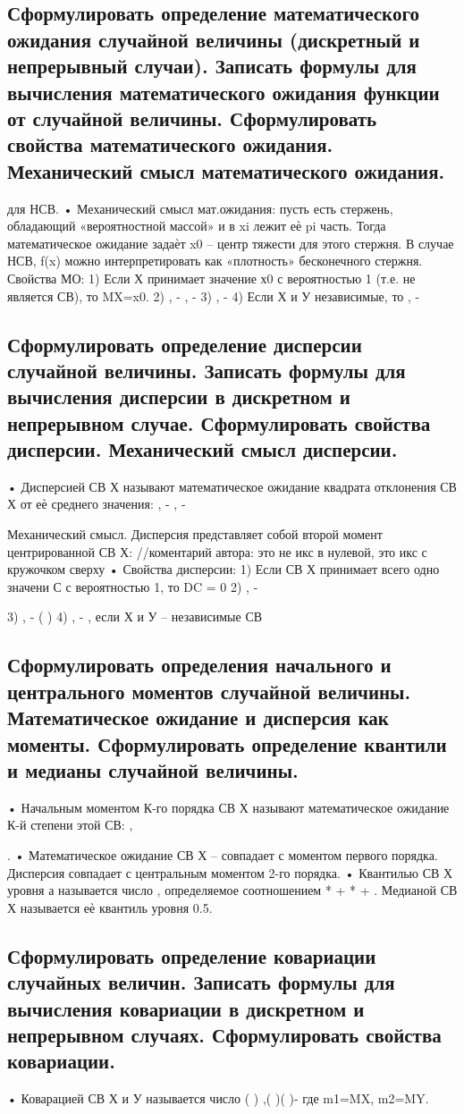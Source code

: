 \subsection{Сформулировать определение математического ожидания случайной величины (дискретный и непрерывный случаи). Записать формулы для вычисления математического ожидания функции от случайной величины. Сформулировать свойства математического ожидания. Механический смысл математического ожидания.}



для НСВ.
• Механический смысл мат.ожидания: пусть есть стержень, обладающий «вероятностной массой» и в xi лежит еѐ pi часть. Тогда
математическое ожидание задаѐт x0 – центр тяжести для этого стержня. В случае НСВ, f(x) можно интерпретировать как «плотность»
бесконечного стержня.
Свойства МО:
1) Если Х принимает значение х0 с вероятностью 1 (т.е. не является СВ), то MX=x0.
2) , - , -
3) , -
4) Если Х и У независимые, то , - 

\subsection{Сформулировать определение дисперсии случайной величины. Записать формулы для вычисления дисперсии в дискретном и непрерывном случае. Сформулировать свойства дисперсии. Механический смысл дисперсии.}

• Дисперсией СВ Х называют математическое ожидание квадрата отклонения СВ Х от еѐ среднего значения: , - , -



Механический смысл. Дисперсия представляет собой второй момент центрированной СВ Х:
//коментарий автора: это не икс в
нулевой, это икс с кружочком сверху
• Свойства дисперсии:
1) Если СВ Х принимает всего одно значени С с вероятностью 1, то DC = 0
2) , -

3) ,
- (
)
4) , - , если Х и У – независимые СВ

\subsection{Сформулировать определения начального и центрального моментов случайной величины. Математическое ожидание и дисперсия как моменты. Сформулировать определение квантили и медианы случайной величины.}

• Начальным моментом К-го порядка СВ Х называют математическое ожидание К-й степени этой СВ: ,



.
• Математическое ожидание СВ Х – совпадает с моментом первого порядка. Дисперсия совпадает с центральным моментом 2-го порядка.
• Квантилью СВ Х уровня а называется число , определяемое соотношением *
+ *
+ . Медианой СВ Х
называется еѐ квантиль уровня 0.5.

\subsection{Сформулировать определение ковариации случайных величин. Записать формулы для вычисления ковариации в дискретном и непрерывном случаях. Сформулировать свойства ковариации.}

• Коварацией СВ Х и У называется число ( ) ,( )( )- где m1=MX, m2=MY.
